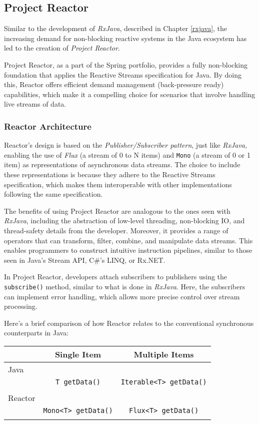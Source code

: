 \subsection{Project Reactor}
\label{sec:project_reactor}

Similar to the development of \textit{RxJava}, described in Chapter \ref{rxjava}, the increasing demand for non-blocking reactive systems in the Java ecosystem has led to the creation of \textit{Project Reactor}. 

Project Reactor, as a part of the Spring portfolio, provides a fully non-blocking foundation that applies the Reactive Streams specification for Java. By doing this, Reactor offers efficient demand management (back-pressure ready) capabilities, which make it a compelling choice for scenarios that involve handling live streams of data.

\subsubsection{Reactor Architecture}
\label{sec:reactor_architecture}

Reactor's design is based on the \textit{Publisher/Subscriber pattern}, just like \textit{RxJava}, enabling the use of \textit{Flux} (a stream of 0 to N items) and \texttt{Mono} (a stream of 0 or 1 item) as representations of asynchronous data streams. The choice to include these representations is because they adhere to the Reactive Streams specification, which makes them interoperable with other implementations following the same specification.

The benefits of using Project Reactor are analogous to the ones seen with \textit{RxJava}, including the abstraction of low-level threading, non-blocking IO, and thread-safety details from the developer. Moreover, it provides a range of operators that can transform, filter, combine, and manipulate data streams. This enables programmers to construct intuitive instruction pipelines, similar to those seen in Java's Stream API, C\#'s LINQ, or Rx.NET.

In Project Reactor, developers attach subscribers to publishers using the \texttt{subscribe()} method, similar to what is done in \textit{RxJava}. Here, the subscribers can implement error handling, which allows more precise control over stream processing.

Here's a brief comparison of how Reactor relates to the conventional synchronous counterparts in Java:

\begin{center}
\begin{tabular}{ |l|c|c| }
\hline
    & Single Item & Multiple Items \\ \hline
    Java & & \\ 
    & \texttt{T getData()}  & \texttt{Iterable<T> getData()} \\
    & & \\
    \hline
    Reactor & & \\ 
    & \texttt{Mono<T> getData()} & \texttt{Flux<T> getData()} \\
    & & \\
    \hline
\end{tabular}
\end{center}

